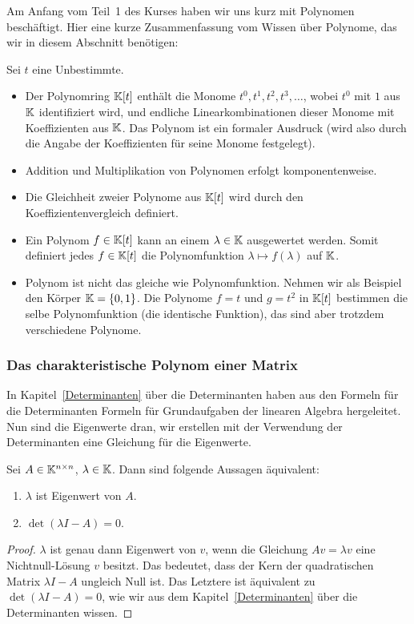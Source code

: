Am Anfang vom Teil~1 des Kurses haben wir uns kurz mit Polynomen beschäftigt. Hier eine kurze Zusammenfassung vom Wissen über Polynome, das wir in diesem Abschnitt benötigen:

\begin{tcolorbox}[title=Wiederholung]
	Sei $ t $ eine Unbestimmte.
	\begin{itemize}
		\item
			Der Polynomring $ \mathbb K[t] $ enthält die Monome $ t^0, t^1, t^2, t^3, \ldots $, wobei $ t^0 $ mit $ 1 $ aus $ \mathbb K $ identifiziert wird, und endliche Linearkombinationen dieser Monome mit Koeffizienten aus $ \mathbb K $. Das Polynom ist ein formaler Ausdruck (wird also durch die Angabe der Koeffizienten für seine Monome festgelegt).
		\item
			Addition und Multiplikation von Polynomen erfolgt komponentenweise.
		\item
			Die Gleichheit zweier Polynome aus $ \mathbb K[t] $ wird durch den Koeffizientenvergleich definiert.
		\item
			Ein Polynom $ f \in \mathbb K[t] $ kann an einem $ \lambda \in \mathbb K $ ausgewertet werden. Somit definiert jedes $ f \in \mathbb K[t] $ die Polynomfunktion $ \lambda \mapsto f(\lambda) $ auf $ \mathbb K $.
		\item Polynom ist nicht das gleiche wie Polynomfunktion. Nehmen wir als Beispiel den Körper $\mathbb K = \{0,1\}$. Die Polynome $f=t$ und $g=t^2$ in $\mathbb K[t]$ bestimmen die selbe Polynomfunktion (die identische Funktion), das sind aber trotzdem verschiedene Polynome. 
	\end{itemize}
\end{tcolorbox}

\subsubsection{Das charakteristische Polynom einer Matrix}

In Kapitel~\ref{Determinanten} über die Determinanten haben aus den Formeln für die Determinanten Formeln für Grundaufgaben der linearen Algebra hergeleitet. Nun sind die Eigenwerte dran, wir erstellen mit der Verwendung der Determinanten eine Gleichung für die Eigenwerte. 

\begin{propn}
	Sei $ A \in \mathbb K^{n \times n} $, $ \lambda \in \mathbb K $. Dann sind folgende Aussagen äquivalent:
	\begin{enumerate}
		\item
			$ \lambda $ ist Eigenwert von $ A $.
		\item
			$ \det(\lambda I - A) = 0 $.
	\end{enumerate}
\end{propn}
\begin{proof}
	$\lambda$ ist genau dann Eigenwert von $v$, wenn die Gleichung $A v = \lambda v$ eine Nichtnull-Lösung $v$ besitzt. Das bedeutet, dass der Kern der quadratischen Matrix $\lambda I - A$ ungleich Null ist. Das Letztere ist äquivalent zu $\det(\lambda I - A) =0$, wie wir aus dem Kapitel~\ref{Determinanten} über die Determinanten wissen. 
\end{proof}

